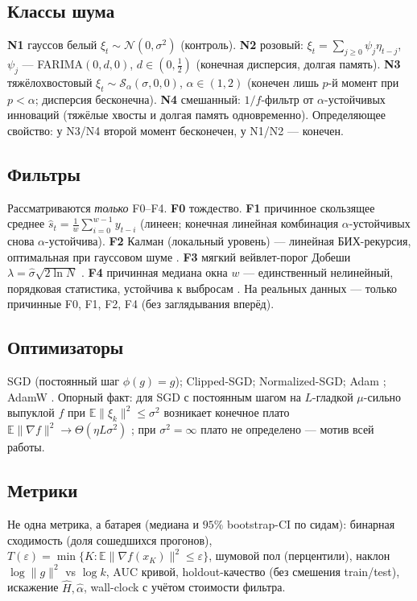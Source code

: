 \documentclass[conference]{IEEEtran}
\newcommand{\E}{\mathbb{E}}
\begin{document}
\subsection{Классы шума}
\textbf{N1} гауссов белый $\xi_t\sim\mathcal N(0,\sigma^2)$ (контроль).
\textbf{N2} розовый: $\xi_t=\sum_{j\ge0}\psi_j\eta_{t-j}$, $\psi_j$ ---
FARIMA$(0,d,0)$, $d\in(0,\tfrac12)$ (конечная дисперсия, долгая
память). \textbf{N3} тяжёлохвостовый $\xi_t\sim
\mathcal S_\alpha(\sigma,0,0)$, $\alpha\in(1,2)$ (конечен лишь $p$-й
момент при $p<\alpha$; дисперсия бесконечна). \textbf{N4} смешанный:
$1/f$-фильтр от $\alpha$-устойчивых инноваций (тяжёлые хвосты и долгая
память одновременно). Определяющее свойство: у N3/N4 второй момент
бесконечен, у N1/N2 --- конечен.

\subsection{Фильтры}
Рассматриваются \emph{только} F0--F4. \textbf{F0} тождество.
\textbf{F1} причинное скользящее среднее
$\hat s_t=\tfrac1w\sum_{i=0}^{w-1}y_{t-i}$ (линеен; конечная линейная
комбинация $\alpha$-устойчивых снова $\alpha$-устойчива). \textbf{F2}
Калман (локальный уровень) --- линейная БИХ-рекурсия, оптимальная при
гауссовом шуме \cite{kalman1960}. \textbf{F3} мягкий вейвлет-порог
Добеши $\lambda=\hat\sigma\sqrt{2\ln N}$
\cite{donoho1994wavelets,mallat1999wavelet}. \textbf{F4} причинная
медиана окна $w$ --- единственный нелинейный, порядковая статистика,
устойчива к выбросам \cite{yin1996median}. На реальных данных ---
только причинные F0, F1, F2, F4 (без заглядывания вперёд).

\subsection{Оптимизаторы}
SGD (постоянный шаг $\phi(g)=g$); Clipped-SGD; Normalized-SGD; Adam
\cite{kingma2015adam}; AdamW \cite{loshchilov2019adamw}. Опорный факт:
для SGD с постоянным шагом на $L$-гладкой $\mu$-сильно выпуклой $f$ при
$\E\|\xi_k\|^2\le\sigma^2$ возникает конечное плато
$\E\|\nabla f\|^2\to\Theta(\eta L\sigma^2)$ \cite{robbins1951sgd};
при $\sigma^2=\infty$ плато не определено --- мотив всей работы.

\subsection{Метрики}
Не одна метрика, а батарея (медиана и $95\%$ bootstrap-CI по сидам):
бинарная сходимость (доля сошедшихся прогонов), $T(\varepsilon)=
\min\{K:\E\|\nabla f(x_K)\|^2\le\varepsilon\}$, шумовой пол
(перцентили), наклон $\log\|g\|^2$ vs $\log k$, AUC кривой,
holdout-качество (без смешения train/test), искажение
$\hat H,\hat\alpha$, wall-clock с учётом стоимости фильтра.
\end{document}
